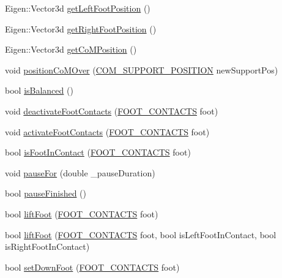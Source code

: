 \begin{DoxyCompactItemize}
\item 
Eigen\+::\+Vector3d \hyperlink{classSteppingDemoClient_af6a814243828f5136476aa5e99ea0079}{get\+Left\+Foot\+Position} ()
\item 
Eigen\+::\+Vector3d \hyperlink{classSteppingDemoClient_ae9c0d72756c109f49c269a7e1b06454a}{get\+Right\+Foot\+Position} ()
\item 
Eigen\+::\+Vector3d \hyperlink{classSteppingDemoClient_a857aa530a4ab94443d0b0869121baf76}{get\+Co\+M\+Position} ()
\item 
void \hyperlink{classSteppingDemoClient_a18609e5634a283423c228106bb0e3a45}{position\+Co\+M\+Over} (\hyperlink{SteppingDemoClient_8h_ac0c3848a609566394821d9826e0fdd5b}{C\+O\+M\+\_\+\+S\+U\+P\+P\+O\+R\+T\+\_\+\+P\+O\+S\+I\+T\+I\+ON} new\+Support\+Pos)
\item 
bool \hyperlink{classSteppingDemoClient_ad8fbc186267a47a73bb77e78199f2b8c}{is\+Balanced} ()
\item 
void \hyperlink{classSteppingDemoClient_a62b5028bdc99de117cfffc576478a0f1}{deactivate\+Foot\+Contacts} (\hyperlink{SteppingDemoClient_8h_ab0673d7f17cdd57b8fa124abb330287f}{F\+O\+O\+T\+\_\+\+C\+O\+N\+T\+A\+C\+TS} foot)
\item 
void \hyperlink{classSteppingDemoClient_abf583698c8c03620516acf3ec6eb9e41}{activate\+Foot\+Contacts} (\hyperlink{SteppingDemoClient_8h_ab0673d7f17cdd57b8fa124abb330287f}{F\+O\+O\+T\+\_\+\+C\+O\+N\+T\+A\+C\+TS} foot)
\item 
bool \hyperlink{classSteppingDemoClient_aeeaa9fac47e3e5a141647b07fa2feaa3}{is\+Foot\+In\+Contact} (\hyperlink{SteppingDemoClient_8h_ab0673d7f17cdd57b8fa124abb330287f}{F\+O\+O\+T\+\_\+\+C\+O\+N\+T\+A\+C\+TS} foot)
\item 
void \hyperlink{classSteppingDemoClient_a6b5d8bf0ce08c8b9f66ac2c1bbd5bcd7}{pause\+For} (double \+\_\+pause\+Duration)
\item 
bool \hyperlink{classSteppingDemoClient_afe78b799d8b8c63cff7d1e8765b7e1fa}{pause\+Finished} ()
\item 
bool \hyperlink{classSteppingDemoClient_a927c8615104a5fd5968ea4ece2c22926}{lift\+Foot} (\hyperlink{SteppingDemoClient_8h_ab0673d7f17cdd57b8fa124abb330287f}{F\+O\+O\+T\+\_\+\+C\+O\+N\+T\+A\+C\+TS} foot)
\item 
bool \hyperlink{classSteppingDemoClient_ae406e5c8f755f234272b63de4d6a774f}{lift\+Foot} (\hyperlink{SteppingDemoClient_8h_ab0673d7f17cdd57b8fa124abb330287f}{F\+O\+O\+T\+\_\+\+C\+O\+N\+T\+A\+C\+TS} foot, bool is\+Left\+Foot\+In\+Contact, bool is\+Right\+Foot\+In\+Contact)
\item 
bool \hyperlink{classSteppingDemoClient_a930123dad5658ea8a3bb5f23cb4cb369}{set\+Down\+Foot} (\hyperlink{SteppingDemoClient_8h_ab0673d7f17cdd57b8fa124abb330287f}{F\+O\+O\+T\+\_\+\+C\+O\+N\+T\+A\+C\+TS} foot)
\end{DoxyCompactItemize}

